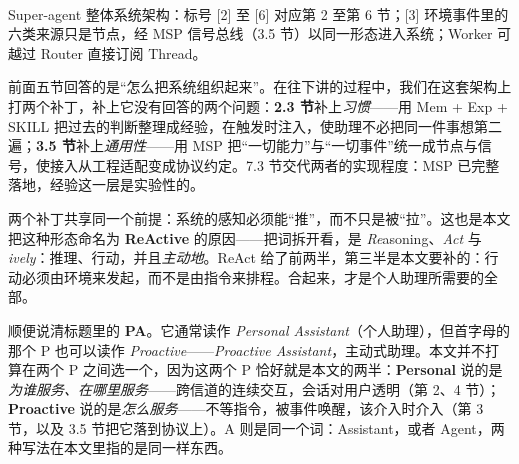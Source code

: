 \documentclass[11pt,a4paper,UTF8,fontset=windows]{ctexart}
\begin{document}
\begin{center}
\\[0.35em]
{\footnotesize\color{dagray}Super-agent 整体系统架构：标号 [2] 至 [6] 对应第 2 至第 6 节；[3] 环境事件里的六类来源只是节点，经 MSP 信号总线（3.5 节）以同一形态进入系统；Worker 可越过 Router 直接订阅 Thread。}
\end{center}

前面五节回答的是“怎么把系统组织起来”。在往下讲的过程中，我们在这套架构上打两个补丁，补上它没有回答的两个问题：\textbf{2.3 节}补上\emph{习惯}——用 Mem + Exp + SKILL 把过去的判断整理成经验，在触发时注入，使助理不必把同一件事想第二遍；\textbf{3.5 节}补上\emph{通用性}——用 MSP 把“一切能力”与“一切事件”统一成节点与信号，使接入从工程适配变成协议约定。7.3 节交代两者的实现程度：MSP 已完整落地，经验这一层是实验性的。

两个补丁共享同一个前提：系统的感知必须能“推”，而不只是被“拉”。这也是本文把这种形态命名为 \textbf{ReActive} 的原因——把词拆开看，是 \emph{Re}asoning、\emph{Act} 与 \emph{ively}：推理、行动，并且\emph{主动地}。ReAct 给了前两半，第三半是本文要补的：行动必须由环境来发起，而不是由指令来排程。合起来，才是个人助理所需要的全部。

顺便说清标题里的 \textbf{PA}。它通常读作 \emph{Personal Assistant}（个人助理），但首字母的那个 P 也可以读作 \emph{Proactive}——\emph{Proactive Assistant}，主动式助理。本文并不打算在两个 P 之间选一个，因为这两个 P 恰好就是本文的两半：\textbf{Personal} 说的是\emph{为谁服务、在哪里服务}——跨信道的连续交互，会话对用户透明（第 2、4 节）；\textbf{Proactive} 说的是\emph{怎么服务}——不等指令，被事件唤醒，该介入时介入（第 3 节，以及 3.5 节把它落到协议上）。A 则是同一个词：Assistant，或者 Agent，两种写法在本文里指的是同一样东西。
\end{document}
